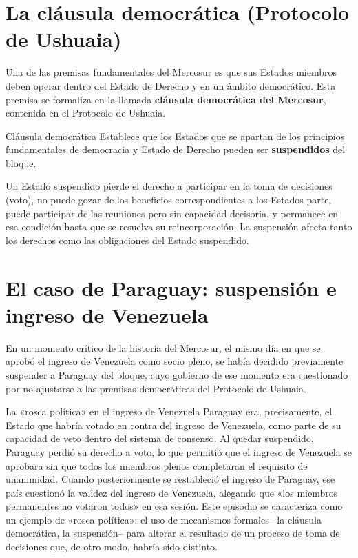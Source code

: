 \documentclass[12pt,oneside]{book}
\begin{document}
\section{La cláusula democrática (Protocolo de Ushuaia)}

Una de las premisas fundamentales del Mercosur es que sus Estados miembros deben operar dentro del Estado de Derecho y en un ámbito democrático. Esta premisa se formaliza en la llamada \textbf{cláusula democrática del Mercosur}, contenida en el Protocolo de Ushuaia.

\begin{definicion}{Cláusula democrática}
Establece que los Estados que se apartan de los principios fundamentales de democracia y Estado de Derecho pueden ser \textbf{suspendidos} del bloque.
\end{definicion}

\begin{importante}
Un Estado suspendido pierde el derecho a participar en la toma de decisiones (voto), no puede gozar de los beneficios correspondientes a los Estados parte, puede participar de las reuniones pero sin capacidad decisoria, y permanece en esa condición hasta que se resuelva su reincorporación. La suspensión afecta tanto los derechos como las obligaciones del Estado suspendido.
\end{importante}

\section{El caso de Paraguay: suspensión e ingreso de Venezuela}

En un momento crítico de la historia del Mercosur, el mismo día en que se aprobó el ingreso de Venezuela como socio pleno, se había decidido previamente suspender a Paraguay del bloque, cuyo gobierno de ese momento era cuestionado por no ajustarse a las premisas democráticas del Protocolo de Ushuaia.

\begin{ejemplo}{La «rosca política» en el ingreso de Venezuela}
Paraguay era, precisamente, el Estado que habría votado en contra del ingreso de Venezuela, como parte de su capacidad de veto dentro del sistema de consenso. Al quedar suspendido, Paraguay perdió su derecho a voto, lo que permitió que el ingreso de Venezuela se aprobara sin que todos los miembros plenos completaran el requisito de unanimidad. Cuando posteriormente se restableció el ingreso de Paraguay, ese país cuestionó la validez del ingreso de Venezuela, alegando que «los miembros permanentes no votaron todos» en esa sesión. Este episodio se caracteriza como un ejemplo de «rosca política»: el uso de mecanismos formales --la cláusula democrática, la suspensión-- para alterar el resultado de un proceso de toma de decisiones que, de otro modo, habría sido distinto.
\end{ejemplo}
\end{document}
